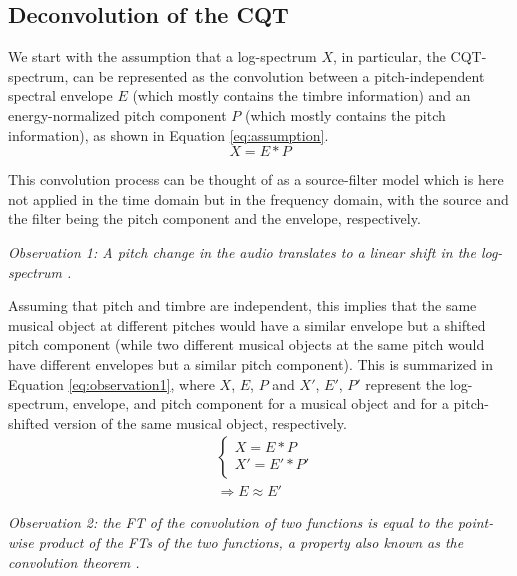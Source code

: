 \documentclass[journal]{IEEEtran}
\begin{document}
\subsection{Deconvolution of the CQT}

We start with the assumption that a log-spectrum $X$, in particular, the CQT-spectrum, can be represented as the convolution between a pitch-independent spectral envelope $E$ (which mostly contains the timbre information) and an energy-normalized pitch component $P$ (which mostly contains the pitch information), as shown in Equation \ref{eq:assumption}. 
\begin{equation}
\label{eq:assumption}
X = E * P
\end{equation}

This convolution process can be thought of as a source-filter model \cite{fant1970} which is here not applied in the time domain but in the frequency domain, with the source and the filter being the pitch component and the envelope, respectively.

\emph{Observation 1: A pitch change in the audio translates to a linear shift in the log-spectrum \cite{brown1991, brown1992}.}

Assuming that pitch and timbre are independent, this implies that the same musical object at different pitches would have a similar envelope but a shifted pitch component (while two different musical objects at the same pitch would have different envelopes but a similar pitch component). This is summarized in Equation \ref{eq:observation1}, where $X$, $E$, $P$ and $X'$, $E'$, $P'$ represent the log-spectrum, envelope, and pitch component for a musical object and for a pitch-shifted version of the same musical object, respectively.
\begin{equation}
\label{eq:observation1}
\begin{split}
& \begin{cases}
X = E * P \\
X' = E' * P' \\
\end{cases} \\
& \Rightarrow E \approx E'
\end{split}
\end{equation}

\emph{Observation 2: the FT of the convolution of two functions is equal to the point-wise product of the FTs of the two functions, a property also known as the convolution theorem \cite{proakis1995}.}
\end{document}
